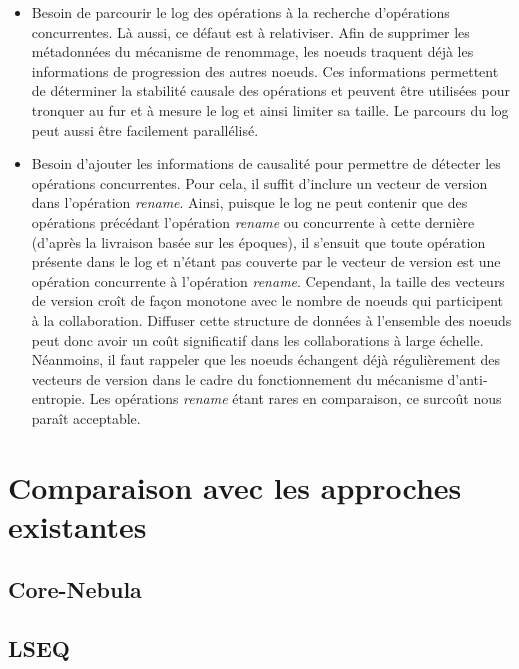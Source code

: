 \documentclass[12pt]{thesul}
\begin{document}
\begin{itemize}
\begin{itemize}
    \item Besoin de parcourir le log des opérations à la recherche d'opérations concurrentes.
      Là aussi, ce défaut est à relativiser.
      Afin de supprimer les métadonnées du mécanisme de renommage, les noeuds traquent déjà les informations de progression des autres noeuds.
      Ces informations permettent de déterminer la stabilité causale des opérations et peuvent être utilisées pour tronquer au fur et à mesure le log et ainsi limiter sa taille.
      Le parcours du log peut aussi être facilement parallélisé.
    \item Besoin d'ajouter les informations de causalité pour permettre de détecter les opérations concurrentes.
      Pour cela, il suffit d'inclure un vecteur de version dans l'opération \emph{rename}.
      Ainsi, puisque le log ne peut contenir que des opérations précédant l'opération \emph{rename} ou concurrente à cette dernière (d'après la livraison basée sur les époques), il s'ensuit que toute opération présente dans le log et n'étant pas couverte par le vecteur de version est une opération concurrente à l'opération \emph{rename}.
      Cependant, la taille des vecteurs de version croît de façon monotone avec le nombre de noeuds qui participent à la collaboration.
      Diffuser cette structure de données à l'ensemble des noeuds peut donc avoir un coût significatif dans les collaborations à large échelle.
      Néanmoins, il faut rappeler que les noeuds échangent déjà régulièrement des vecteurs de version dans le cadre du fonctionnement du mécanisme d'anti-entropie.
      Les opérations \emph{rename} étant rares en comparaison, ce surcoût nous paraît acceptable.
  \end{itemize}
\end{itemize}

\section{Comparaison avec les approches existantes}

\subsection{Core-Nebula}
\subsection{LSEQ}
\end{document}
